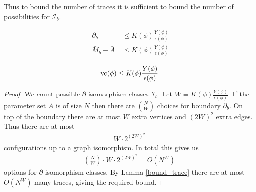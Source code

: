 \documentclass{amsart}
\newcommand{\II}{\mathscr I}
\begin{document}
Thus to bound the number of traces it is sufficient to bound the number of possibilities for $\II_b$.

\begin{Theorem} \label{main_bound}
	\begin{align*}
		|\partial_b| &\leq K(\phi) \frac{Y(\phi)}{\epsilon(\phi)}\\
		|\bar M_b - \bar A| &\leq K(\phi) \frac{Y(\phi)}{\epsilon(\phi)}
	\end{align*}
\end{Theorem}

\begin{Corollary}
	\begin{align*}
		\operatorname{vc}(\phi) \leq K(\phi) \frac{Y(\phi)}{\epsilon(\phi)}
	\end{align*}
\end{Corollary}

\begin{proof}
		We count possible $\partial$-isomorphism classes $\II_b$.
		Let $W = K(\phi) \frac{Y(\phi)}{\epsilon(\phi)}$.
		If the parameter set $A$ is of size $N$ then there are $N \choose W$ choices for boundary $\partial_b$.
		On top of the boundary there are at most $W$ extra vertices and $(2W)^2$ extra edges.
		Thus there are at most
		\begin{align*}
			W \cdot 2^{(2W)^2}
		\end{align*}
		configurations up to a graph isomorphism.
		In total this gives us 
		\begin{align*}
			{N \choose W} \cdot W \cdot 2^{(2W)^2} = O(N^W)
		\end{align*}
		options for $\partial$-isomorphism classes.
		By Lemma \ref{bound_trace} there are at most $O(N^W)$ many traces, giving the required bound.
\end{proof}
\end{document}

